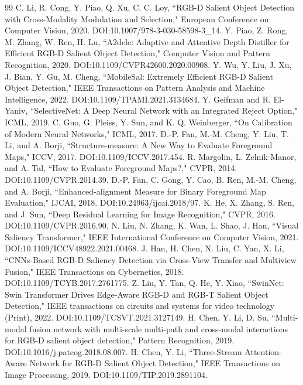\documentclass[11pt]{article}
\begin{document}
\begin{thebibliography}{99}
 C. Li, R. Cong, Y. Piao, Q. Xu, C. C. Loy, ``RGB-D Salient Object Detection with Cross-Modality Modulation and Selection," European Conference on Computer Vision, 2020. DOI:10.1007/978-3-030-58598-3\_14.
 Y. Piao, Z. Rong, M. Zhang, W. Ren, H. Lu, ``A2dele: Adaptive and Attentive Depth Distiller for Efficient RGB-D Salient Object Detection," Computer Vision and Pattern Recognition, 2020. DOI:10.1109/CVPR42600.2020.00908.
 Y. Wu, Y. Liu, J. Xu, J. Bian, Y. Gu, M. Cheng, ``MobileSal: Extremely Efficient RGB-D Salient Object Detection," IEEE Transactions on Pattern Analysis and Machine Intelligence, 2022. DOI:10.1109/TPAMI.2021.3134684.
 Y. Geifman and R. El-Yaniv, ``SelectiveNet: A Deep Neural Network with an Integrated Reject Option," ICML, 2019.
 C. Guo, G. Pleiss, Y. Sun, and K. Q. Weinberger, ``On Calibration of Modern Neural Networks," ICML, 2017.
 D.-P. Fan, M.-M. Cheng, Y. Liu, T. Li, and A. Borji, ``Structure-measure: A New Way to Evaluate Foreground Maps," ICCV, 2017. DOI:10.1109/ICCV.2017.454.
 R. Margolin, L. Zelnik-Manor, and A. Tal, ``How to Evaluate Foreground Maps?," CVPR, 2014. DOI:10.1109/CVPR.2014.39.
 D.-P. Fan, C. Gong, Y. Cao, B. Ren, M.-M. Cheng, and A. Borji, ``Enhanced-alignment Measure for Binary Foreground Map Evaluation," IJCAI, 2018. DOI:10.24963/ijcai.2018/97.
 K. He, X. Zhang, S. Ren, and J. Sun, ``Deep Residual Learning for Image Recognition," CVPR, 2016. DOI:10.1109/CVPR.2016.90.
 N. Liu, N. Zhang, K. Wan, L. Shao, J. Han, ``Visual Saliency Transformer," IEEE International Conference on Computer Vision, 2021. DOI:10.1109/ICCV48922.2021.00468.
 J. Han, H. Chen, N. Liu, C. Yan, X. Li, ``CNNs-Based RGB-D Saliency Detection via Cross-View Transfer and Multiview Fusion," IEEE Transactions on Cybernetics, 2018. DOI:10.1109/TCYB.2017.2761775.
 Z. Liu, Y. Tan, Q. He, Y. Xiao, ``SwinNet: Swin Transformer Drives Edge-Aware RGB-D and RGB-T Salient Object Detection," IEEE transactions on circuits and systems for video technology (Print), 2022. DOI:10.1109/TCSVT.2021.3127149.
 H. Chen, Y. Li, D. Su, ``Multi-modal fusion network with multi-scale multi-path and cross-modal interactions for RGB-D salient object detection," Pattern Recognition, 2019. DOI:10.1016/j.patcog.2018.08.007.
 H. Chen, Y. Li, ``Three-Stream Attention-Aware Network for RGB-D Salient Object Detection," IEEE Transactions on Image Processing, 2019. DOI:10.1109/TIP.2019.2891104.

\end{thebibliography}
\end{document}
